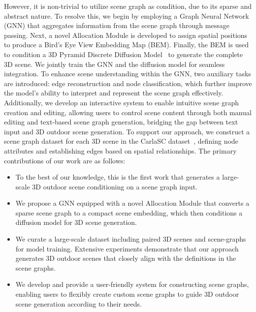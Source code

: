 However, it is non-trivial to utilize scene graph as condition, due to its sparse and abstract nature. To resolve this, 
we begin by employing a Graph Neural Network (GNN) that aggregates information from the scene graph through message passing. Next, a novel Allocation Module is developed to assign spatial positions to produce a Bird's Eye View Embedding Map (BEM). Finally, the BEM is used to condition a 3D Pyramid Discrete Diffusion Model~\cite{pdd} to generate the complete 3D scene. 
%
We jointly train the GNN and the diffusion model for seamless integration. 
%
To enhance scene understanding within the GNN, two auxiliary tasks are introduced: edge reconstruction and node classification, which further improve the model's ability to interpret and represent the scene graph effectively. 
%
Additionally, we develop an interactive system to enable intuitive scene graph creation and editing, allowing users to control scene content through both manual editing and text-based scene graph generation, bridging the gap between text input and 3D outdoor scene generation. To support our approach, we construct a scene graph dataset for each 3D scene in the CarlaSC dataset~\cite{carlasc}, defining node attributes and establishing edges based on spatial relationships. The primary contributions of our work are as follows:
\begin{itemize}
\item To the best of our knowledge, this is the first work that generates a large-scale 3D outdoor scene conditioning on a scene graph input.
\item We propose a GNN equipped with a novel Allocation Module that converts a sparse scene graph to a compact scene embedding, which then conditions a diffusion model for 3D scene generation.
\item We curate a large-scale dataset including paired 3D scenes and scene-graphs for model training. Extensive experiments demonstrate that our approach generates 3D outdoor scenes that closely align with the definitions in the scene graphs.
\item We develop and provide a user-friendly system for constructing scene graphs, enabling users to flexibly create custom scene graphs to guide 3D outdoor scene generation according to their needs.
\end{itemize}

